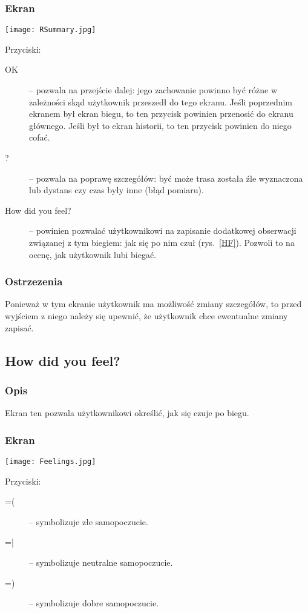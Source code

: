 \subsubsection{Ekran}
\begin{minipage}{0.5\textwidth}
  \texttt{[image: RSummary.jpg]}
  \label{RS}
\end{minipage}
\begin{minipage}{0.5\textwidth}
Przyciski:\\
\begin{description}
  \item[OK] -- pozwala na przejście dalej: jego zachowanie powinno być różne w zależności skąd użytkownik przeszedł do tego ekranu. Jeśli poprzednim ekranem był ekran biegu, to ten przycisk powinien przenosić do ekranu głównego. Jeśli był to ekran historii, to ten przycisk powinien do niego cofać.
  \item[?] -- pozwala na poprawę szczegółów: być może trasa została źle wyznaczona lub dystans czy czas były inne (błąd pomiaru).
  \item[How did you feel?] -- powinien pozwalać użytkownikowi na zapisanie dodatkowej obserwacji związanej z tym biegiem: jak się po nim czuł (rys.~\ref{HF}). Pozwoli to na ocenę, jak użytkownik lubi biegać.
\end{description}
\end{minipage}
\subsubsection{Ostrzezenia}
\noindent Ponieważ w tym ekranie użytkownik ma możliwość zmiany szczegółów, to przed wyjściem z niego należy się upewnić, że użytkownik chce ewentualne zmiany zapisać.
\subsection{How did you feel?}
\subsubsection{Opis}
\noindent Ekran ten pozwala użytkownikowi określić, jak się czuje po biegu.
\subsubsection{Ekran}
\begin{minipage}{0.5\textwidth}
  \texttt{[image: Feelings.jpg]}
  \label{HF}
\end{minipage}
\begin{minipage}{0.5\textwidth}
Przyciski:\\
\begin{description}
  \item[=(] -- symbolizuje złe samopoczucie.
  \item[=|] -- symbolizuje neutralne samopoczucie.
  \item[=)] -- symbolizuje dobre samopoczucie.
\end{description}
\end{minipage}

